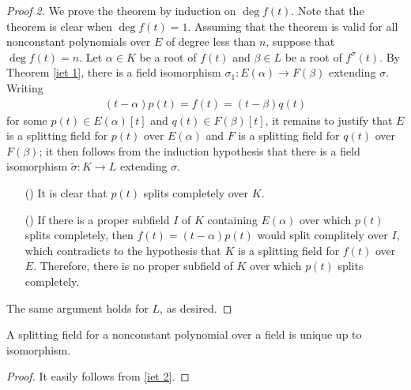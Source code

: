 \begin{proof}[Proof 2]
    We prove the theorem by induction on $\deg f(t)$.
    Note that the theorem is clear when $\deg f(t)=1$.
    Assuming that the theorem is valid for all nonconstant polynomials over $E$ of degree less than $n$, suppose that $\deg f(t)=n$.
    Let $\alpha\in K$ be a root of $f(t)$ and $\beta\in L$ be a root of $f^\sigma(t)$.
    By Theorem \ref{iet 1}, there is a field isomorphism $\sigma_1: E(\alpha)\rightarrow F(\beta)$ extending $\sigma$.
    Writing
    \begin{align*}
        (t-\alpha)p(t)=f(t)=(t-\beta)q(t)
    \end{align*}
    for some $p(t)\in E(\alpha)[t]$ and $q(t)\in F(\beta)[t]$, it remains to justify that $E$ is a splitting field for $p(t)$ over $E(\alpha)$ and $F$ is a splitting field for $q(t)$ over $F(\beta)$; it then follows from the induction hypothesis that there is a field isomorphism $\widetilde{\sigma}: K\rightarrow L$ extending $\sigma$.
    \begin{enumerate}
        \item[(\romannumeral 1)]
        {
            It is clear that $p(t)$ splits completely over $K$.
        }
        \item[(\romannumeral 2)]
        {
            If there is a proper subfield $I$ of $K$ containing $E(\alpha)$ over which $p(t)$ splits completely, then $f(t)=(t-\alpha)p(t)$ would split complitely over $I$, which contradicts to the hypothesis that $K$ is a splitting field for $f(t)$ over $E$.
            Therefore, there is no proper subfield of $K$ over which $p(t)$ splits completely.
        }
    \end{enumerate}
    The same argument holds for $L$, as desired.
\end{proof}
\begin{cor}
    A splitting field for a nonconstant polynomial over a field is unique up to isomorphism.
\end{cor}
\begin{proof}
    It easily follows from \cref{iet 2}.
\end{proof}

